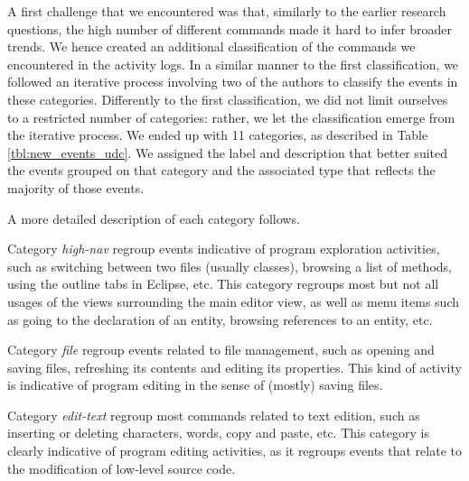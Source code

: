 \documentclass[times]{smrauth}
\begin{document}
A first challenge that we encountered was that, similarly to the earlier research questions, the high number of different commands made it hard to infer broader trends. We hence created an additional classification of the commands we encountered in the activity logs. In a similar manner to the first classification, we followed an iterative process involving two of the authors to classify the events in these categories. Differently to the first classification, we did not limit ourselves to a restricted number of categories: rather, we let the classification emerge from the iterative process. We ended up with 11 categories, as described in Table \ref{tbl:new_events_udc}. We assigned the label and description that better suited the events grouped on that category and the associated type that reflects the majority of those events.



A more detailed description of each category follows.

Category \emph{high-nav} regroup events indicative of program exploration activities, such as switching between two files (usually classes), browsing a list of methods, using the outline tabs in Eclipse, etc. This category regroups most but not all usages of the views surrounding the main editor view, as well as menu items such as going to the declaration of an entity, browsing references to an entity, etc.

Category \emph{file} regroup events related to file management, such as opening and saving files, refreshing its contents and editing its properties. This kind of activity is indicative of program editing in the sense of (mostly) saving files.

Category \emph{edit-text} regroup most commands related to text edition, such as inserting or deleting characters, words, copy and paste, etc. This category is clearly indicative of program editing activities, as it regroups events that relate to the modification of low-level source code.
\end{document}
